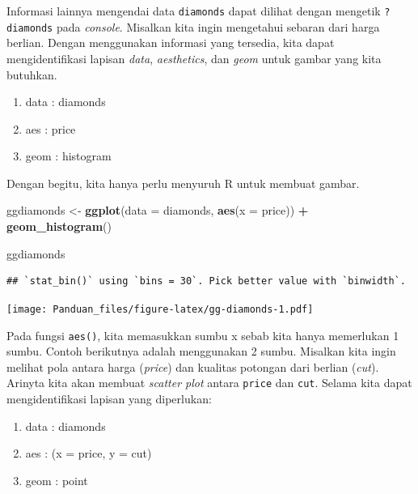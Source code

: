 \documentclass[]{book}
\newenvironment{Shaded}{\begin{snugshade}}{\end{snugshade}}
\newcommand{\KeywordTok}[1]{\textcolor[rgb]{0.13,0.29,0.53}{\textbf{#1}}}
\newcommand{\DataTypeTok}[1]{\textcolor[rgb]{0.13,0.29,0.53}{#1}}
\newcommand{\StringTok}[1]{\textcolor[rgb]{0.31,0.60,0.02}{#1}}
\newcommand{\OperatorTok}[1]{\textcolor[rgb]{0.81,0.36,0.00}{\textbf{#1}}}
\newcommand{\NormalTok}[1]{#1}
\providecommand{\tightlist}{%
  \setlength{\itemsep}{0pt}\setlength{\parskip}{0pt}}
\begin{document}
Informasi lainnya mengendai data \texttt{diamonds} dapat dilihat dengan
mengetik \texttt{?diamonds} pada \emph{console}. Misalkan kita ingin
mengetahui sebaran dari harga berlian. Dengan menggunakan informasi yang
tersedia, kita dapat mengidentifikasi lapisan \emph{data},
\emph{aesthetics}, dan \emph{geom} untuk gambar yang kita butuhkan.

\begin{enumerate}
\def\labelenumi{\arabic{enumi}.}
\tightlist
\item
  data : diamonds
\item
  aes : price
\item
  geom : histogram
\end{enumerate}

Dengan begitu, kita hanya perlu menyuruh R untuk membuat gambar.

\begin{Shaded}
\begin{Highlighting}[]
\NormalTok{ggdiamonds <-}\StringTok{ }\KeywordTok{ggplot}\NormalTok{(}\DataTypeTok{data =}\NormalTok{ diamonds, }\KeywordTok{aes}\NormalTok{(}\DataTypeTok{x =}\NormalTok{ price)) }\OperatorTok{+}
\StringTok{        }\KeywordTok{geom_histogram}\NormalTok{()}

\NormalTok{ggdiamonds}
\end{Highlighting}
\end{Shaded}

\begin{verbatim}
## `stat_bin()` using `bins = 30`. Pick better value with `binwidth`.
\end{verbatim}

\texttt{[image: Panduan\_files/figure-latex/gg-diamonds-1.pdf]}

Pada fungsi \texttt{aes()}, kita memasukkan sumbu x sebab kita hanya
memerlukan 1 sumbu. Contoh berikutnya adalah menggunakan 2 sumbu.
Misalkan kita ingin melihat pola antara harga (\emph{price}) dan
kualitas potongan dari berlian (\emph{cut}). Arinyta kita akan membuat
\emph{scatter plot} antara \texttt{price} dan \texttt{cut}. Selama kita
dapat mengidentifikasi lapisan yang diperlukan:

\begin{enumerate}
\def\labelenumi{\arabic{enumi}.}
\tightlist
\item
  data : diamonds
\item
  aes : (x = price, y = cut)
\item
  geom : point
\end{enumerate}
\end{document}
